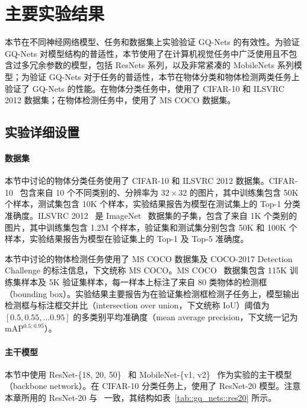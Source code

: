 \section{主要实验结果} \label{sec::gq_nets::exp}
本节在不同神经网络模型、任务和数据集上实验验证 GQ-Nets 的有效性。为验证 GQ-Nets 对模型结构的普适性，本节使用了在计算机视觉任务中广泛使用且不包含过多冗余参数的模型，包括 ResNets 系列，以及非常紧凑的 MobileNets 系列模型；为验证 GQ-Nets 对于任务的普适性，本节在物体分类和物体检测两类任务上验证了 GQ-Nets 的性能。在物体分类任务中，使用了 CIFAR-10 和 ILSVRC 2012 数据集；在物体检测任务中，使用了 MS COCO 数据集。
\subsection{实验详细设置} \label{sec::gq_nets::general_conf}
\paragraph{数据集}
本节中讨论的物体分类任务使用了 CIFAR-10 和 ILSVRC 2012 数据集。CIFAR-10~\citep{krizhevsky2009learning} 包含来自 10 个不同类别的、分辨率为 $32 \times 32$ 的图片，其中训练集包含 50K 个样本，测试集包含 10K 个样本，实验结果报告为模型在测试集上的 Top-1 分类准确度。ILSVRC 2012~\citep{ILSVRC15} 是 ImageNet~\citep{deng2009imagenet} 数据集的子集，包含了来自 1K 个类别的图片，其中训练集包含 1.2M 个样本，验证集和测试集分别包含 50K 和 100K 个样本，实验结果报告为模型在验证集上的 Top-1 及 Top-5 准确度。

本节中讨论的物体检测任务使用了 MS COCO 数据集及 COCO-2017 Detection Challenge 的标注信息，下文统称 MS COCO。MS COCO~\citep{lin2014microsoft} 数据集包含 115K 训练集样本及 5K 验证集样本，每一样本上标注了来自 80 类物体的检测框（bounding box）。实验结果主要报告为在验证集检测框检测子任务上，模型输出检测框与标注框交并比（intersection over union，下文统称 IoU）阈值为 $[0.5, 0.55, \ldots 0.95]$ 的多类别平均准确度（mean average precision，下文统一记为 $\mathrm{mAP}^{0.5:0.95}$）。

\paragraph{主干模型}
本节中使用 ResNet-\{18, 20, 50\}~\citep{He_2016} 和 MobileNet-\{v1, v2\}~\citep{howard2017mobilenets, Sandler_2018} 作为实验的主干模型（backbone network）。在 CIFAR-10 分类任务上，使用了 ResNet-20 模型。注意本章所用的 ResNet-20 与~\citet{zhou2016dorefanet, choi2018pact, li2019additive} 一致，其结构如表~\ref{tab::gq_nets::res20} 所示。

